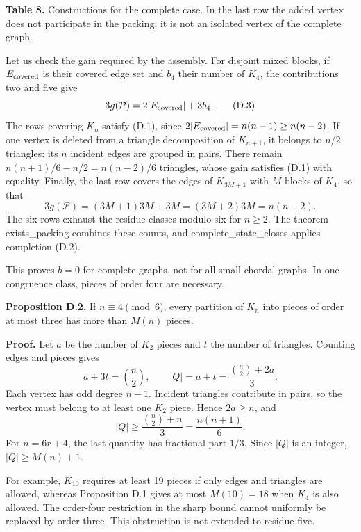 \documentclass[english,11pt,a4paper]{article}
\begin{document}
\textbf{Table 8.} Constructions for the complete case. In the last row the added vertex does not participate in the packing; it is not an isolated vertex of the complete graph.

Let us check the gain required by the assembly. For disjoint mixed blocks, if \(E_{\rm covered}\) is their covered edge set and \(b_4\) their number of \(K_4\), the contributions two and five give \[
3g(\mathcal P)=2|E_{\rm covered}|+3b_4.
\tag{D.3}
\] The rows covering \(K_n\) satisfy (D.1), since \(2|E_{\rm covered}|=n(n-1)\ge n(n-2)\). If one vertex is deleted from a triangle decomposition of \(K_{n+1}\), it belongs to \(n/2\) triangles: its \(n\) incident edges are grouped in pairs. There remain \(n(n+1)/6-n/2=n(n-2)/6\) triangles, whose gain satisfies (D.1) with equality. Finally, the last row covers the edges of \(K_{3M+1}\) with \(M\) blocks of \(K_4\), so that \[
3g(\mathcal P)=(3M+1)3M+3M=(3M+2)3M=n(n-2).
\tag{D.4}
\] The six rows exhaust the residue classes modulo six for \(n\ge2\). The theorem {\ttfamily\small exists\_\discretionary{\hbox{\ensuremath{\hookrightarrow}}}{}{}packing} combines these counts, and {\ttfamily\small complete\_\discretionary{\hbox{\ensuremath{\hookrightarrow}}}{}{}state\_\discretionary{\hbox{\ensuremath{\hookrightarrow}}}{}{}closes} applies completion (D.2).

This proves \(b=0\) for complete graphs, not for all small chordal graphs. In one congruence class, pieces of order four are necessary.

\textbf{Proposition D.2.} If \(n\equiv4\pmod6\), every partition of \(K_n\) into pieces of order at most three has more than \(M(n)\) pieces.

\textbf{Proof.} Let \(a\) be the number of \(K_2\) pieces and \(t\) the number of triangles. Counting edges and pieces gives \[
a+3t=\binom n2,\qquad |Q|=a+t=\frac{\binom n2+2a}{3}.
\tag{D.5}
\] Each vertex has odd degree \(n-1\). Incident triangles contribute in pairs, so the vertex must belong to at least one \(K_2\) piece. Hence \(2a\ge n\), and \[
|Q|\ge\frac{\binom n2+n}{3}=\frac{n(n+1)}6.
\] For \(n=6r+4\), the last quantity has fractional part \(1/3\). Since \(|Q|\) is an integer, \(|Q|\ge M(n)+1\).

For example, \(K_{10}\) requires at least 19 pieces if only edges and triangles are allowed, whereas Proposition D.1 gives at most \(M(10)=18\) when \(K_4\) is also allowed. The order-four restriction in the sharp bound cannot uniformly be replaced by order three. This obstruction is not extended to residue five.
\end{document}
